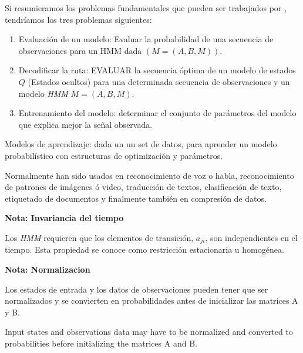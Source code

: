 Si resumieramos los problemas fundamentales que pueden ser trabajados por \HMM, tendríamos los tres problemas siguientes:

\begin{enumerate}
	
\item Evaluación de un modelo: Evaluar la probabilidad de una secuencia de observaciones para un HMM dada  $(M = (A, B, M)).$


\item Decodificar la ruta:  EVALUAR la secuencia óptima de un modelo de estados $Q$ (Estados ocultos) para una determinada secuencia de observaciones y un modelo \emph{HMM}  $M = (A, B, M).$

\item  Entrenamiento del modelo:   determinar el conjunto de parámetros del modelo que explica mejor la señal observada.

\end{enumerate}


Modelos de aprendizaje: dada un un set de datos, para aprender un modelo probabilístico con estructuras de optimización y parámetros.



Normalmente han sido usados en reconocimiento de voz o habla, reconocimiento de patrones de imágenes ó video, traducción de textos, clasificación de texto, etiquetado de documentos y finalmente también en compresión de datos.






\textbf{Nota: Invariancia del tiempo}

Los \textit{HMM} requieren que los elementos de transición, $a_{ji}$, son independientes en el tiempo. Esta propiedad se conoce como restricción estacionaria u homogénea.

\textbf{Nota: Normalizacion}

Los estados de entrada y los datos de observaciones pueden tener que ser normalizados y se convierten en probabilidades antes de inicializar las matrices A y B.

Input states and observations data may have to be normalized and converted to probabilities before initializing the matrices A and B.




